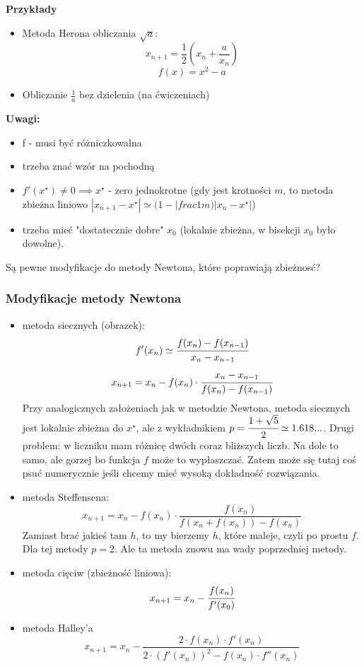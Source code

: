 \documentclass[hidelinks,a4paper,fleqn,oneside]{book}
\begin{document}
\textbf{Przykłady}

\begin{itemize}
	\item Metoda Herona obliczania $\sqrt{a}$:
		\[
			x_{n+1} = \frac{1}{2}(x_n + \frac{a}{x_n})
		\]
		\[
			f(x) = x^2 - a
		\]
	\item Obliczanie $\frac{1}{a}$ bez dzielenia (na ćwiczeniach)
\end{itemize}

\textbf{Uwagi:}

\begin{itemize}
	\item f - musi być różniczkowalna
	\item trzeba znać wzór na pochodną
	\item $f'(x^\star) \neq 0 \implies x^\star $ - zero jednokrotne (gdy jest krotności $m$, to metoda zbieżna liniowo $|x_{n+1} - x^\star| \simeq (1 - |frac{1}{m}) |x_n - x^\star|$)\
	\item trzeba mieć "dostatecznie dobre" $x_0$ (lokalnie zbieżna, w bisekcji $x_0$ było dowolne).
\end{itemize}

Są pewne modyfikacje do metody Newtona, które poprawiają zbieżnosć?

\subsubsection{Modyfikacje metody Newtona}
\begin{itemize}
	\item metoda siecznych (obrazek):
	\[
		f'(x_n) \simeq \cfrac{f(x_n) - f(x_{n-1})}{x_n - x_{n-1}}
	\]
	\[
		x_{n+1} = x_n - f(x_n) \cdot \cfrac{x_n - x_{n-1}}{f(x_n) - f(x_{n-1})}
	\]
	Przy analogicznych założeniach jak w metodzie Newtona, metoda siecznych jest lokalnie zbieżna do $x^\star$, ale z wykładnikiem $p = \cfrac{1+\sqrt{5}}{2} \simeq 1.618...$. Drugi problem: w liczniku mam różnicę dwóch coraz bliższych liczb. Na dole to samo, ale gorzej bo funkcja $f$ może to wypłaszczać. Zatem może się tutaj coś psuć numerycznie jeśli chcemy mieć wysoką dokładność rozwiązania.
	\item metoda Steffensena:
	\[
		x_{n+1} = x_n - f(x_n) \cdot \frac{f(x_n)}{f(x_n + f(x_n)) - f(x_n)}
	\]
	Zamiast brać jakieś tam $h$, to my bierzemy $h$, które maleje, czyli po prostu $f$. Dla tej metody $p = 2$. Ale ta metoda znowu ma wady poprzedniej metody.
	\item metoda cięciw (zbieżność liniowa):
	\[
		x_{n+1} = x_n - \cfrac{f(x_n)}{f'(x_0)}
	\]
	\item metoda Halley'a
	\[
	x_{n+1}= x_n - \frac{2 \cdot f(x_n) \cdot f'(x_n) }{ 2 \cdot \left( f'(x_n) \right)^2 - f(x_n) \cdot f''(x_n) }
	\]
\end{itemize}
\end{document}
